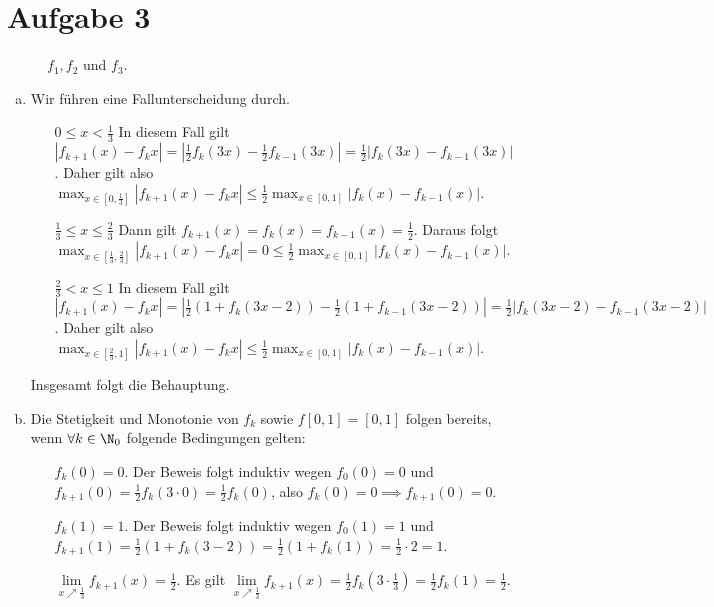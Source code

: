 \documentclass{article}
\begin{document}
    \section*{Aufgabe 3}
    \begin{figure}
        \centering
        
        \caption{$f_1, f_2$ und $f_3$.}
    \end{figure}
    \begin{enumerate}[(a)]
        \item
        Wir führen eine Fallunterscheidung durch.
        \begin{itemize}
            \item[$0 \leq x < \frac{1}{3}$] In diesem Fall gilt $|f_{k+1}(x) - f_k{x}| = |\frac{1}{2}f_k(3x) - \frac{1}{2}f_{k-1}(3x)| = \frac{1}{2}|f_k(3x) - f_{k-1}(3x)|$. Daher gilt also $\max_{x\in [0,\frac{1}{3}]}|f_{k+1}(x) - f_k{x}| \leq \frac{1}{2} \max_{x\in [0,1]}|f_k(x) - f_{k-1}(x)|$.
            \item[$\frac{1}{3} \leq x \leq \frac{2}{3}$] Dann gilt $f_{k+1}(x) = f_k(x) = f_{k-1}(x) = \frac{1}{2}$. Daraus folgt $\max_{x\in [\frac{1}{3}, \frac{2}{3}]}|f_{k+1}(x) - f_k{x}| = 0 \leq \frac{1}{2} \max_{x\in [0,1]}|f_k(x) - f_{k-1}(x)|$.
            \item[$\frac{2}{3} < x \leq 1$] In diesem Fall gilt $|f_{k+1}(x) - f_k{x}| = |\frac{1}{2}(1 + f_k(3x - 2)) - \frac{1}{2}(1 + f_{k-1}(3x-2))| = \frac{1}{2}|f_k(3x-2) - f_{k-1}(3x-2)|$. Daher gilt also $\max_{x\in [\frac{2}{3}, 1]}|f_{k+1}(x) - f_k{x}| \leq \frac{1}{2} \max_{x\in [0,1]}|f_k(x) - f_{k-1}(x)|$.
        \end{itemize}
        Insgesamt folgt die Behauptung.
        \item Die Stetigkeit und Monotonie von $f_k$ sowie $f[0,1] = [0,1]$ folgen bereits, wenn $\forall k \in \N_0$ folgende Bedingungen gelten:
        \begin{enumerate}[(i)]
            \item[$f_k(0) = 0$.] Der Beweis folgt induktiv wegen $f_0(0) = 0$ und $f_{k+1}(0) = \frac{1}{2}f_k(3 \cdot 0) = \frac{1}{2}f_k(0)$, also $f_k(0) = 0 \implies f_{k+1}(0) = 0$.
            \item[$f_k(1) = 1$.] Der Beweis folgt induktiv wegen $f_0(1) = 1$ und $f_{k+1}(1) = \frac{1}{2}(1 + f_k(3 - 2)) = \frac{1}{2}(1 + f_k(1)) = \frac{1}{2} \cdot 2 = 1$.
            \item[$\lim\limits_{x \nearrow \frac{1}{3}} f_{k+1}(x) = \frac{1}{2}$.] Es gilt $\lim\limits_{x \nearrow \frac{1}{3}} f_{k+1}(x) = \frac{1}{2}f_k(3\cdot \frac{1}{3}) = \frac{1}{2} f_k(1) = \frac{1}{2}$.

\end{enumerate}
\end{enumerate}
\end{document}
